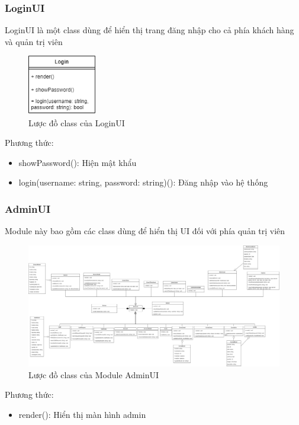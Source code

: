 \subsubsection{LoginUI}
LoginUI là một class dùng để hiển thị trang đăng nhập cho cả phía khách hàng và quản trị viên
\begin{figure}[!htp]
	\begin{center}
		\includegraphics[width=3cm]{img/Architecture/UI/loginUI.png}
	\end{center}
	\caption{Lược đồ class của LoginUI}
\end{figure}

Phương thức:
\begin{itemize}
	\item showPassword(): Hiện mật khẩu
	\item login(username: string, password: string)(): Đăng nhập vào hệ thống
\end{itemize}

\subsubsection{AdminUI}
Module này bao gồm các class dùng để hiển thị UI đối với phía quản trị viên

\begin{figure}[!htp]
	\centering
	\includegraphics[width=17cm]{img/Architecture/UI/adminUI.png}
	\newline
	\caption{Lược đồ class của Module AdminUI}
\end{figure}

Phương thức:
\begin{itemize}
	\item render(): Hiển thị màn hình admin
\end{itemize}

